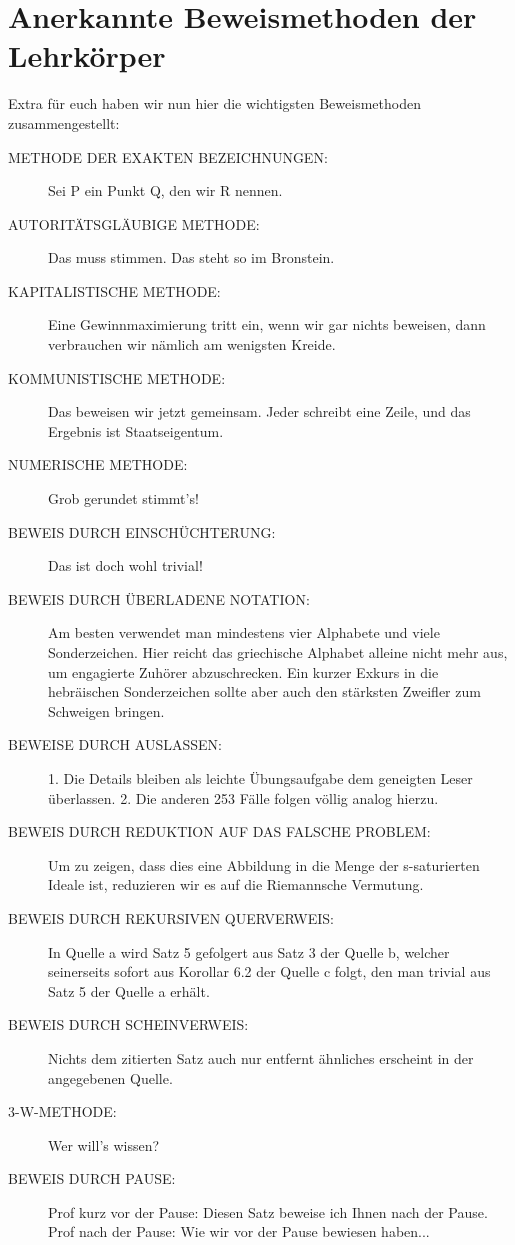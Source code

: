 \section{Anerkannte Beweismethoden der Lehrkörper}
\label{sec:beweise}
Extra für euch haben wir nun hier die wichtigsten Beweismethoden zusammengestellt:\\
\begin{description}
    \item[METHODE DER EXAKTEN BEZEICHNUNGEN:] Sei P ein Punkt Q, den wir R nennen.

    \item[AUTORITÄTSGLÄUBIGE METHODE:] Das muss stimmen. Das steht so im Bronstein.

    \item[KAPITALISTISCHE METHODE:] Eine Gewinnmaximierung tritt ein, wenn wir gar nichts beweisen, dann verbrauchen wir nämlich am wenigsten Kreide.

    \item[KOMMUNISTISCHE METHODE:] Das beweisen wir jetzt gemeinsam. Jeder schreibt eine Zeile, und das Ergebnis ist Staatseigentum.

    \item [NUMERISCHE METHODE:] Grob gerundet stimmt's!

    \item [BEWEIS DURCH EINSCHÜCHTERUNG:] Das ist doch wohl trivial!

    \item [BEWEIS DURCH ÜBERLADENE NOTATION:] Am besten verwendet man mindestens vier Alphabete und viele Sonderzeichen. Hier reicht das griechische Alphabet alleine nicht mehr aus, um engagierte Zuhörer abzuschrecken. Ein kurzer Exkurs in die hebräischen Sonderzeichen sollte aber auch den stärksten Zweifler zum Schweigen bringen.

    \item [BEWEISE DURCH AUSLASSEN:] 1. Die Details bleiben als leichte Übungsaufgabe dem geneigten Leser überlassen. 2. Die anderen 253 Fälle folgen völlig analog hierzu.

    \item [BEWEIS DURCH REDUKTION AUF DAS FALSCHE PROBLEM:] Um zu zeigen, dass dies eine Abbildung in die Menge der s-saturierten Ideale ist, reduzieren wir es auf die Riemannsche Vermutung.

    \item [BEWEIS DURCH REKURSIVEN QUERVERWEIS:] In Quelle a wird Satz 5 gefolgert aus Satz 3 der Quelle b, welcher seinerseits sofort aus Korollar 6.2 der Quelle c folgt, den man trivial aus Satz 5 der Quelle a erhält.

    \item [BEWEIS DURCH SCHEINVERWEIS:] Nichts dem zitierten Satz auch nur entfernt ähnliches erscheint in der angegebenen Quelle.

    \item [3-W-METHODE:] Wer will's wissen?

    \item [BEWEIS DURCH PAUSE:] Prof kurz vor der Pause: Diesen Satz beweise ich Ihnen nach der Pause. Prof nach der Pause: Wie wir vor der Pause bewiesen haben...
\end{description}